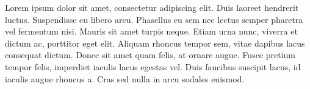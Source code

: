 \documentclass[final,conference,11pt]{IEEEtran}
\begin{document}
Lorem ipsum dolor sit amet, consectetur adipiscing elit. Duis laoreet hendrerit luctus. Suspendisse eu libero arcu. Phasellus eu sem nec lectus semper pharetra vel fermentum nisi. Mauris sit amet turpis neque. Etiam urna nunc, viverra et dictum ac, porttitor eget elit. Aliquam rhoncus tempor sem, vitae dapibus lacus consequat dictum. Donec sit amet quam felis, at ornare augue. Fusce pretium tempor felis, imperdiet iaculis lacus egestas vel. Duis faucibus suscipit lacus, id iaculis augue rhoncus a. Cras sed nulla in arcu sodales euismod.



\pagebreak
\end{document}
